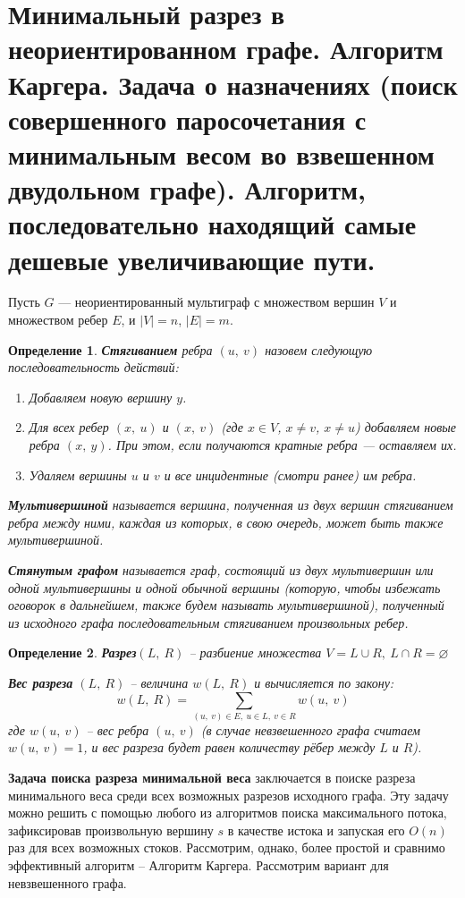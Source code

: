 \documentclass[a4paper,12pt]{article}
\newtheorem*{definition}{Определение}
\begin{document}
\section{Минимальный разрез в неориентированном графе. Алгоритм Каргера. Задача о назначениях (поиск совершенного паросочетания с минимальным весом во взвешенном двудольном графе). Алгоритм, последовательно находящий самые дешевые увеличивающие пути.}
Пусть $G$ — неориентированный мультиграф с множеством вершин $V$ и множеством ребер $E$, и $|V| = n$, $|E| = m$.
\begin{definition}
    \textbf{Стягиванием} ребра $(u,\ v)$ назовем следующую последовательность действий:
    \begin{enumerate}
        \item Добавляем новую вершину $y$.
        \item Для всех ребер $(x,\ u)$ и $(x,\ v)$ (где $x \in V$, $x \neq v$, $x \neq u$) добавляем новые ребра $(x,\ y)$. При этом, если получаются кратные ребра — оставляем их.
        \item Удаляем вершины $u$ и $v$ и все инцидентные (смотри ранее) им ребра.
    \end{enumerate}
    
    \textbf{Мультивершиной} называется вершина, полученная из двух вершин стягиванием ребра между ними, каждая из которых, в свою очередь, может быть также мультивершиной.
    
    \textbf{Стянутым графом} называется граф, состоящий из двух мультивершин или одной мультивершины и одной обычной вершины (которую, чтобы избежать оговорок в дальнейшем, также будем называть мультивершиной), полученный из исходного графа последовательным стягиванием произвольных ребер.
\end{definition}
\begin{definition}
    \textbf{Разрез}$(L,\ R)$ -- разбиение множества $V = L \cup R,\ L \cap R = \varnothing$
    
    \textbf{Вес разреза} $(L,\ R)$ -- величина $w(L,\ R)$ и вычисляется по закону:\[w(L,\ R) = \sum\limits_{(u,\ v) \in E,\ u \in L,\ v \in R} w(u,\ v)\] где $w(u,\ v)$ -- вес ребра $(u,\ v)$ (в случае невзвешенного графа считаем $w(u,\ v) = 1$, и вес разреза будет равен количеству рёбер между $L$ и $R$).
\end{definition}

\textbf{Задача поиска разреза минимальной веса}  заключается в поиске разреза минимального веса среди всех возможных разрезов исходного графа. Эту задачу можно решить с помощью любого из алгоритмов поиска максимального потока, зафиксировав произвольную вершину $s$ в качестве истока и запуская его $O(n)$ раз для всех возможных стоков. Рассмотрим, однако, более простой и сравнимо эффективный алгоритм -- Алгоритм Каргера. Рассмотрим вариант для невзвешенного графа.
\end{document}
